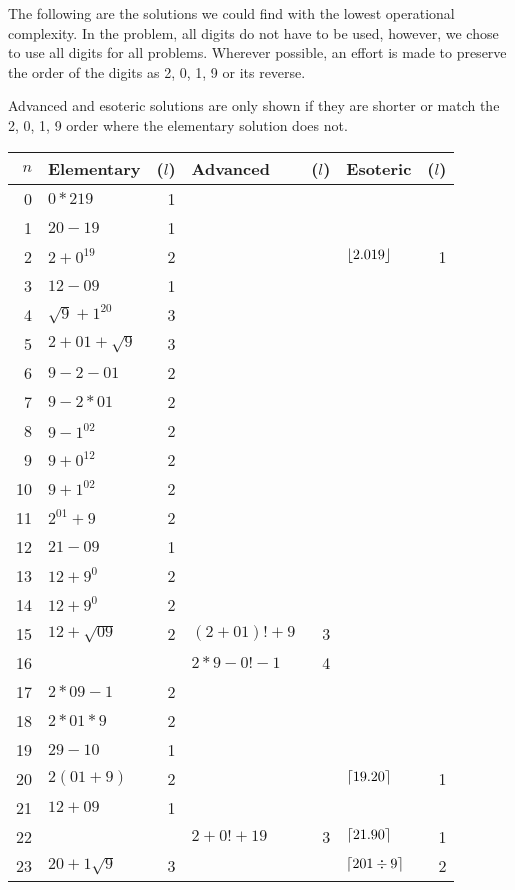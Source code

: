 The following are the solutions we could find with the lowest operational complexity.
In the problem, all digits do not have to be used, however, we chose to use all digits for all problems.
Wherever possible, an effort is made to preserve the order of the digits as 2, 0, 1, 9 or its reverse.

Advanced and esoteric solutions are only shown if they are shorter or match the 2, 0, 1, 9 order where the elementary solution does not.

\begin{longtable}{r l r l r l r}
\toprule
$n$ & Elementary & ($l$) & Advanced & ($l$) & Esoteric & ($l$) \\ \midrule
\endhead%
0 & $0*219$ & 1 \\ \midrule
1 & $20-19$ & 1 \\ \midrule
2 & $2+0^{19}$ & 2 & & & $\lfloor2.019\rfloor$ & 1 \\ \midrule
3 & $12-09$ & 1 \\ \midrule
4 & $\sqrt{9}+1^{20}$ & 3 \\ \midrule
5 & $2+01+\sqrt{9}$ & 3 \\ \midrule
6 & $9-2-01$ & 2 \\ \midrule
7 & $9-2*01$ & 2 \\ \midrule
8 & $9-1^{02}$ & 2 \\ \midrule
9 & $9+0^{12}$ & 2 \\ \midrule
\midrule
10 & $9+1^{02}$ & 2 \\ \midrule
11 & $2^{01}+9$ & 2 \\ \midrule
12 & $21-09$ & 1 \\ \midrule
13 & $12+9^0$ & 2 \\ \midrule
14 & $12+9^0$ & 2 \\ \midrule
15 & $12+\sqrt{09}$ & 2 & $(2+01)!+9$ & 3 \\ \midrule
16 & & & $2*9-0!-1$ & 4 \\ \midrule
17 & $2*09-1$ & 2& \\ \midrule
18 & $2*01*9$ & 2 \\ \midrule
19 & $29-10$ & 1 \\ \midrule
\midrule
20 & $2(01+9)$ & 2 & & & $\lceil19.20\rceil$ & 1 \\ \midrule
21 & $12+09$ & 1 \\ \midrule
22 & & & $2+0!+19$ & 3 & $\lceil21.90\rceil$ & 1 \\ \midrule
23 & $20+1\sqrt{9}$ & 3 & & & $\lceil201\div9\rceil$ & 2 \\ \midrule

\end{longtable}
